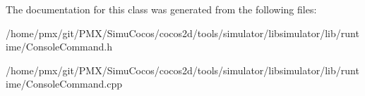 The documentation for this class was generated from the following files\+:\begin{DoxyCompactItemize}
\item 
/home/pmx/git/\+P\+M\+X/\+Simu\+Cocos/cocos2d/tools/simulator/libsimulator/lib/runtime/Console\+Command.\+h\item 
/home/pmx/git/\+P\+M\+X/\+Simu\+Cocos/cocos2d/tools/simulator/libsimulator/lib/runtime/Console\+Command.\+cpp\end{DoxyCompactItemize}
